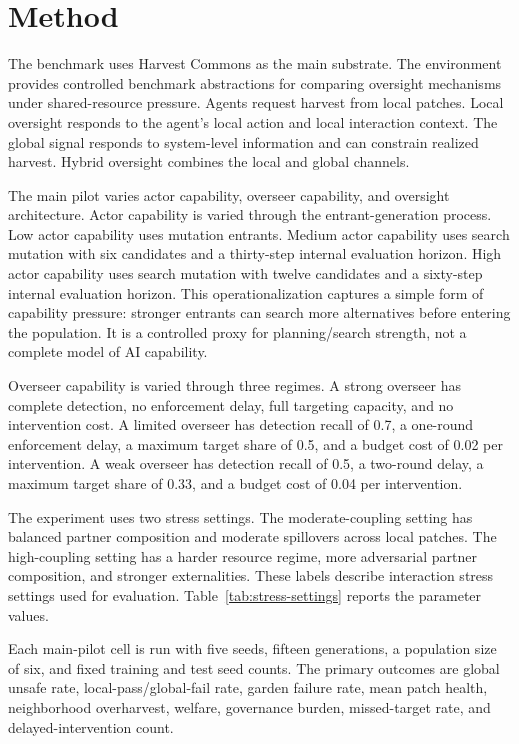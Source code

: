 \documentclass[11pt]{article}
\begin{document}
\section{Method}

The benchmark uses Harvest Commons as the main substrate. The environment provides controlled benchmark abstractions for comparing oversight mechanisms under shared-resource pressure. Agents request harvest from local patches. Local oversight responds to the agent's local action and local interaction context. The global signal responds to system-level information and can constrain realized harvest. Hybrid oversight combines the local and global channels.

The main pilot varies actor capability, overseer capability, and oversight architecture. Actor capability is varied through the entrant-generation process. Low actor capability uses mutation entrants. Medium actor capability uses search mutation with six candidates and a thirty-step internal evaluation horizon. High actor capability uses search mutation with twelve candidates and a sixty-step internal evaluation horizon. This operationalization captures a simple form of capability pressure: stronger entrants can search more alternatives before entering the population. It is a controlled proxy for planning/search strength, not a complete model of AI capability.

Overseer capability is varied through three regimes. A strong overseer has complete detection, no enforcement delay, full targeting capacity, and no intervention cost. A limited overseer has detection recall of 0.7, a one-round enforcement delay, a maximum target share of 0.5, and a budget cost of 0.02 per intervention. A weak overseer has detection recall of 0.5, a two-round delay, a maximum target share of 0.33, and a budget cost of 0.04 per intervention.

The experiment uses two stress settings. The moderate-coupling setting has balanced partner composition and moderate spillovers across local patches. The high-coupling setting has a harder resource regime, more adversarial partner composition, and stronger externalities. These labels describe interaction stress settings used for evaluation. Table~\ref{tab:stress-settings} reports the parameter values.



Each main-pilot cell is run with five seeds, fifteen generations, a population size of six, and fixed training and test seed counts. The primary outcomes are global unsafe rate, local-pass/global-fail rate, garden failure rate, mean patch health, neighborhood overharvest, welfare, governance burden, missed-target rate, and delayed-intervention count.
\end{document}
